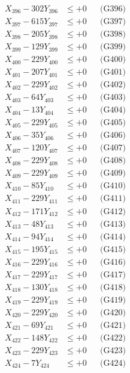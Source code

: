 \documentclass[a4paper,10pt]{article}
\begin{document}
{\begin{align}
X_{396} - 302Y_{396} &\leq +0 && \text{(G396)} \\
X_{397} - 615Y_{397} &\leq +0 && \text{(G397)} \\
X_{398} - 205Y_{398} &\leq +0 && \text{(G398)} \\
X_{399} - 129Y_{399} &\leq +0 && \text{(G399)} \\
X_{400} - 229Y_{400} &\leq +0 && \text{(G400)} \\
\allowbreak
X_{401} - 207Y_{401} &\leq +0 && \text{(G401)} \\
X_{402} - 229Y_{402} &\leq +0 && \text{(G402)} \\
X_{403} - 64Y_{403} &\leq +0 && \text{(G403)} \\
X_{404} - 13Y_{404} &\leq +0 && \text{(G404)} \\
X_{405} - 229Y_{405} &\leq +0 && \text{(G405)} \\
X_{406} - 35Y_{406} &\leq +0 && \text{(G406)} \\
X_{407} - 120Y_{407} &\leq +0 && \text{(G407)} \\
X_{408} - 229Y_{408} &\leq +0 && \text{(G408)} \\
X_{409} - 229Y_{409} &\leq +0 && \text{(G409)} \\
X_{410} - 85Y_{410} &\leq +0 && \text{(G410)} \\
\allowbreak
X_{411} - 229Y_{411} &\leq +0 && \text{(G411)} \\
X_{412} - 171Y_{412} &\leq +0 && \text{(G412)} \\
X_{413} - 48Y_{413} &\leq +0 && \text{(G413)} \\
X_{414} - 94Y_{414} &\leq +0 && \text{(G414)} \\
X_{415} - 195Y_{415} &\leq +0 && \text{(G415)} \\
X_{416} - 229Y_{416} &\leq +0 && \text{(G416)} \\
X_{417} - 229Y_{417} &\leq +0 && \text{(G417)} \\
X_{418} - 130Y_{418} &\leq +0 && \text{(G418)} \\
X_{419} - 229Y_{419} &\leq +0 && \text{(G419)} \\
X_{420} - 229Y_{420} &\leq +0 && \text{(G420)} \\
\allowbreak
X_{421} - 69Y_{421} &\leq +0 && \text{(G421)} \\
X_{422} - 148Y_{422} &\leq +0 && \text{(G422)} \\
X_{423} - 229Y_{423} &\leq +0 && \text{(G423)} \\
X_{424} - 7Y_{424} &\leq +0 && \text{(G424)} \\

\end{align}}
\end{document}
